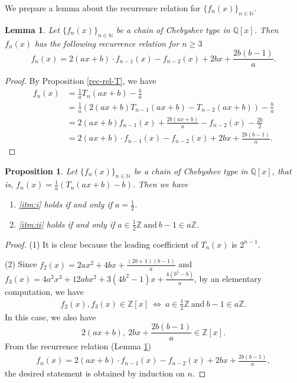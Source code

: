 \documentclass[a4paper, 11pt]{amsart}
\numberwithin{equation}{section}
\newtheorem{prop}[thm]{Proposition}
\newtheorem{lem}[thm]{Lemma}
\theoremstyle{definition}
\newcommand{\Z}{\mathbb{Z}}
\newcommand{\N}{\mathbb{N}}
\newcommand{\Q}{\mathbb{Q}}
\begin{document}
We prepare a lemma about the recurrence relation for $\{f_n(x)\}_{n \in \N}$.
\begin{lem}\label{rec-rel}
Let $\{f_n(x)\}_{n \in \N}$ be a chain of Chebyshev type in $\Q[x]$. 
Then $f_n(x)$ has the following recurrence relation for $n\geq 3$
\[
f_n(x) 
= 2(ax + b)\cdot f_{n-1}(x) - f_{n-2}(x) + 2bx + \frac{2b(b - 1)}{a}.
\]
\end{lem}
\begin{proof}
By Proposition \ref{rec-rel-T}, we have
\begin{align*}
f_n(x)
&=\frac{1}{a}T_n(ax + b) - \frac ba\\
&=\frac{1}{a}(2(ax+b)T_{n-1}(ax+b)-T_{n-2}(ax+b)) - \frac ba\\
&=2(ax+b)f_{n-1}(x)+\frac{2b(ax+b)}a-f_{n-2}(x)-\frac{2b}2\\
&=2(ax + b)\cdot f_{n-1}(x) - f_{n-2}(x) + 2bx + \frac{2b(b - 1)}{a}.
\end{align*}
\end{proof}



\begin{prop}\label{Z[x]-T}
Let $\{f_n(x)\}_{n \in \N}$ be a chain of Chebyshev type in $\Q[x]$, that is, $f_n(x) = \frac{1}{a} (T_n(ax + b) - b)$. 
Then we have
\begin{enumerate}[{\rm (1)}]
\item
\ref{itm:i} holds if and only if $a = \frac{1}{2}$.
\item
\ref{itm:ii} holds if and only if  $a\in \frac12 \Z\ \text{and}\ b-1\in a\Z$. 
\end{enumerate}
\end{prop}


\begin{proof}
(1)
It is clear because the leading coefficient of $T_n(x)$ is $2^{n-1}$.

(2)
Since $f_2(x) = 2ax^2 + 4bx + \frac{(2b + 1)(b - 1)}{a}$ and $f_3(x)=4a^2x^3+12abx^2+3(4b^2-1)x+\frac{4(b^3-b)}a$, by an elementary computation, we have
\begin{align*}
f_2(x), f_3(x)\in \Z[x]\ \iff \  a\in \frac12 \Z\ \text{and}\ b-1\in a\Z.
\end{align*}
In this case, we also have
\[
2(ax + b),\ 2bx + \frac{2b(b - 1)}{a} \in \Z[x].
\]
From the recurrence relation (Lemma \ref{rec-rel})
\begin{align*}
f_n(x) 
= 2(ax + b)\cdot f_{n-1}(x) - f_{n-2}(x) + 2bx + \frac{2b(b - 1)}{a},
\end{align*}
the desired statement is obtained by induction on $n$.
\end{proof}
\end{document}
